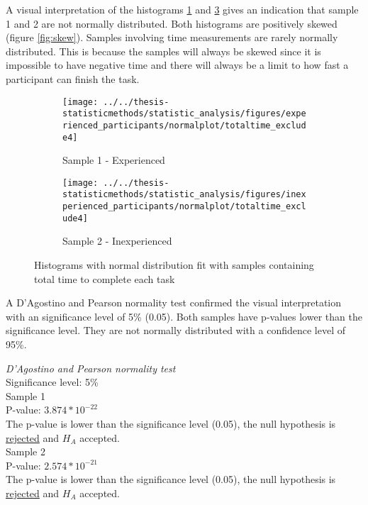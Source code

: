 A visual interpretation of the histograms \ref{fig:totaltimeexclude4_experienced} and \ref{fig:totaltimeexclude4_inexperienced} gives an indication that sample 1 and 2 are not normally distributed. Both histograms are positively skewed (figure \ref{fig:skew}). Samples involving time measurements are rarely normally distributed. This is because the samples will always be skewed since it is impossible to have negative time and there will always be a limit to how fast a participant can finish the task. 

\begin{figure}[H]
	\centering
	\begin{subfigure}[b]{0.48\textwidth}
		\centering
		\texttt{[image: ../../thesis-statisticmethods/statistic\_analysis/figures/experienced\_participants/normalplot/totaltime\_exclude4]}
		\caption{Sample 1 - Experienced}
		\label{fig:totaltimeexclude4_experienced}
	\end{subfigure}
	\begin{subfigure}[b]{0.48\textwidth}
		\centering
		\texttt{[image: ../../thesis-statisticmethods/statistic\_analysis/figures/inexperienced\_participants/normalplot/totaltime\_exclude4]}
		\caption{Sample 2 - Inexperienced}
		\label{fig:totaltimeexclude4_inexperienced}
	\end{subfigure}
\caption{Histograms with normal distribution fit with samples containing total time to complete each task}
\end{figure}

A D'Agostino and Pearson normality test confirmed the visual interpretation with an significance level of 5\% (0.05). Both samples have p-values lower than the significance level. They are not normally distributed with a confidence level of 95\%. \\[0.5cm]

\begin{center}
	\begin{tcolorbox}[width=0.80\textwidth]
		\centering
				\textit{D'Agostino and Pearson normality test}\\
				Significance level: 5\%  \\[0.5cm]
	
				Sample 1\\
				P-value: $3.874 * 10^{-22}$\\
				The p-value is lower than the significance level (0.05), the null hypothesis is \underline{rejected} and $H_A$ accepted.\\[0.5cm]
				
				Sample 2\\
				P-value: $2.574 * 10^{-21}$ \\
				The p-value is lower than the significance level (0.05), the null hypothesis is \underline{rejected} and $H_A$ accepted.\\[0.5cm]
	\end{tcolorbox} 
\end{center}

